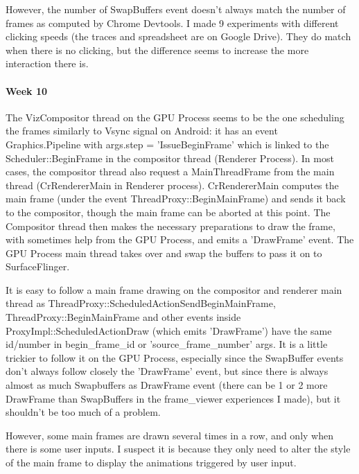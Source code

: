 \documentclass{kththesis}
\begin{document}
However, the number of SwapBuffers event doesn't always match the number of frames as computed by Chrome Devtools. I made 9 experiments with different clicking speeds (the traces and spreadsheet are on Google Drive). They do match when there is no clicking, but the difference seems to increase the more interaction there is.

\paragraph{Week 10}
The VizCompositor thread on the GPU Process seems to be the one scheduling the frames similarly to Vsync signal on Android: it has an event Graphics.Pipeline with args.step = 'IssueBeginFrame' which is linked to the Scheduler::BeginFrame in the compositor thread (Renderer Process). In most cases, the compositor thread also request a MainThreadFrame from the main thread (CrRendererMain in Renderer process). CrRendererMain computes the main frame (under the event ThreadProxy::BeginMainFrame) and sends it back to the compositor, though the main frame can be aborted at this point. The Compositor thread then makes the necessary preparations to draw the frame, with sometimes help from the GPU Process, and emits a 'DrawFrame' event. The GPU Process main thread takes over and swap the buffers to pass it on to SurfaceFlinger.

It is easy to follow a main frame drawing on the compositor and renderer main thread as ThreadProxy::ScheduledActionSendBeginMainFrame, ThreadProxy::BeginMainFrame and other events inside ProxyImpl::ScheduledActionDraw (which emits 'DrawFrame') have the same id/number in begin{\_}frame{\_}id or 'source{\_}frame{\_}number' args. It is a little trickier to follow it on the GPU Process, especially since the SwapBuffer events don't always follow closely the 'DrawFrame' event, but since there is always almost as much Swapbuffers as DrawFrame event (there can be 1 or 2 more DrawFrame than SwapBuffers in the frame{\_}viewer experiences I made), but it shouldn't be too much of a problem.

However, some main frames are drawn several times in a row, and only when there is some user inputs. I suspect it is because they only need to alter the style of the main frame to display the animations triggered by user input.
\end{document}
